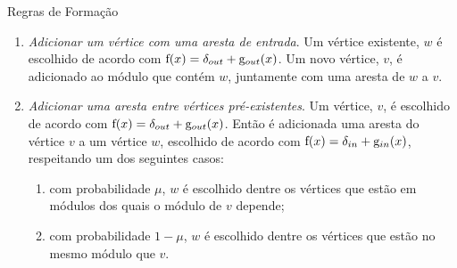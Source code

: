 \begin{section}{Regras de Formação}
\begin{enumerate}
\item \emph{Adicionar um vértice com uma aresta de entrada}. Um vértice existente, $w$ é escolhido de acordo com $\mathrm{f}(x) = \delta_{out} + \mathrm{g}_{out}(x)$. Um novo vértice, $v$, é adicionado ao módulo que contém $w$, juntamente com uma aresta de $w$ a $v$.

\item \emph{Adicionar uma aresta entre vértices pré-existentes}. Um vértice, $v$, é escolhido de acordo com $\mathrm{f}(x) = \delta_{out} + \mathrm{g}_{out}(x)$. Então é adicionada uma aresta do vértice $v$ a um vértice $w$, escolhido de acordo com $\mathrm{f}(x) = \delta_{in} + \mathrm{g}_{in}(x)$, respeitando um dos seguintes casos:

\begin{enumerate}
  \item com probabilidade $\mu$, $w$ é escolhido dentre os vértices que estão em módulos dos quais o módulo de $v$ depende;
  \item com probabilidade $1 - \mu$, $w$ é escolhido dentre os vértices que estão no mesmo módulo que $v$.
\end{enumerate}

\end{enumerate}
\end{section}

